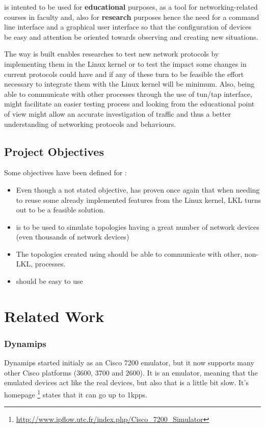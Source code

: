 \project is intented to be used for \textbf{educational} purposes, as a tool for networking-related courses in faculty and, also for \textbf{research} purposes hence the need for a command line interface and a graphical user interface so that the configuration of devices be easy and attention be oriented towards observing and creating new situations.

The way \project is built enables researches to test new network protocols by implementing them in the Linux kernel or to test the impact some changes in current protocols could have and if any of these turn to be feasible the effort necessary to integrate them with the Linux kernel will be minimum. Also, being able to communicate with other processes through the use of tun/tap interface, might facilitate an easier testing process and looking from the educational point of view might allow an accurate investigation of traffic and thus a better understanding of networking protocols and behaviours.  

\subsection{Project Objectives}
\label{sub-sec:proj-objectives}
Some objectives have been defined for \project:
\begin{itemize}
\item Even though a not stated objective, \project has proven once again that when needing to reuse some already implemented features from the Linux kernel, LKL turns out to be a feasible solution.
\item \project is to be used to simulate topologies having a great number of network devices (even thousands of network devices)
\item The topologies created using \project should be able to communicate with other, non-LKL, processes.
\item \project should be easy to use
\end{itemize}

\section{Related Work}
\label{sec:proj-related}

\subsubsection{Dynamips}

Dynamips started initialy as an Cisco 7200 emulator, but it now supports many other
Cisco platforms (3600, 3700 and 2600). It is an emulator, meaning that the emulated
devices act like the real devices, but also that is a little bit slow. It's
homepage \footnote{\url{http://www.ipflow.utc.fr/index.php/Cisco_7200_Simulator}}
states that it can go up to 1kpps. 

